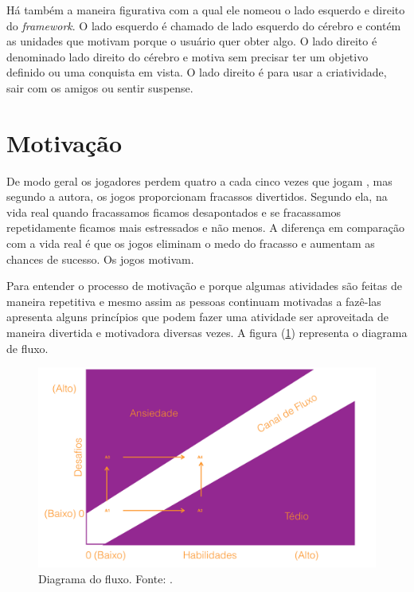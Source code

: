 Há também a maneira figurativa com a qual ele nomeou o lado esquerdo e direito do \textit{framework}. O lado esquerdo é chamado de lado esquerdo do cérebro e contém as unidades que motivam porque o usuário quer obter algo. O lado direito é denominado lado direito do cérebro e motiva sem precisar ter um objetivo definido ou uma conquista em vista. O lado direito é para usar a criatividade, sair com os amigos ou sentir suspense.

\section{Motivação}

De modo geral os jogadores perdem quatro a cada cinco vezes que jogam \cite{mcgonigal2011reality}, mas segundo a autora, os jogos proporcionam fracassos divertidos. Segundo ela, na vida real quando fracassamos ficamos desapontados e se fracassamos repetidamente ficamos mais estressados e não menos. A diferença em comparação com a vida real é que os jogos eliminam o medo do fracasso e aumentam as chances de sucesso. Os jogos motivam.

Para entender o processo de motivação e porque algumas atividades são feitas de maneira repetitiva e mesmo assim as pessoas continuam motivadas a fazê-las \cite{1990flow} apresenta alguns princípios que podem fazer uma atividade ser aproveitada de maneira divertida e motivadora diversas vezes. A figura (\ref{flowfig}) representa o diagrama de fluxo.


\begin{figure}[h]
	\centering
		\includegraphics[keepaspectratio=true,scale=0.5]{figuras/flowfig.png}
	\caption{Diagrama do fluxo. Fonte: \cite{1990flow}.\label{flowfig}
}
\end{figure}



